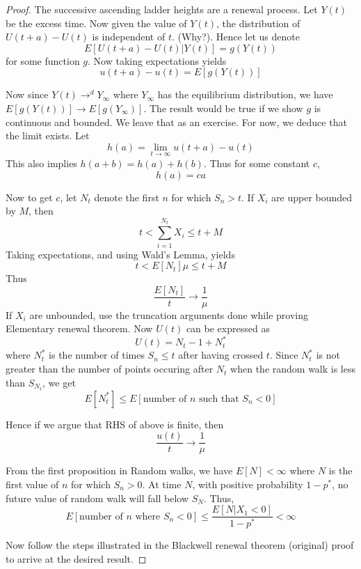 \documentclass[a4paper,10pt,english]{article}
\begin{document}
\begin{proof}
The successive ascending ladder heights are a renewal process. Let $Y(t)$ be the excess time. Now given the value of $Y(t)$, the distribution of $U(t+a) - U(t)$ is independent of $t$. (Why?). Hence let us denote
\[E[U(t+a) - U(t)|Y(t)] = g(Y(t))\]
for some function $g$. Now taking expectations yields
\[u(t+a) - u(t) = E[g(Y(t))]\]

Now since $Y(t) \to^d Y_\infty$ where $Y_\infty$ has the equilibrium distribution, we have $E[g(Y(t))] \to E[g(Y_\infty)]$. The result would be true if we show $g$ is continuous and bounded. We leave that as an exercise. For now, we deduce that the limit exists. Let
\[h(a) = \lim_{t \to \infty}u(t+a) - u(t)\]
This also implies $h(a+b) = h(a) + h(b)$. Thus for some constant $c$, 
\[h(a) = ca\]

Now to get $c$, let $N_t$ denote the first $n$ for which $S_n > t$. If $X_i$ are upper bounded by $M$, then
\[t < \sum_{i=1}^{N_t} X_i \leq t+M\]
Taking expectations, and using Wald's Lemma, yields
\[t < E[N_t]\mu \leq t+M\]
Thus 
\[\frac{E[N_t]}{t} \to \frac{1}{\mu}\]
If $X_i$ are unbounded, use the truncation arguments done while proving Elementary renewal theorem. Now $U(t)$ can be expressed as
\[U(t) = N_t -1 +N_t^*\]
where $N_t^*$ is the number of times $S_n \leq t$ after having crossed $t$. Since $N_t^*$ is not greater than the number of points occuring after $N_t$ when the random walk is less than $S_{N_t}$, we get
\[E[N_t^*] \leq E[\mbox{number of $n$ such that $S_n < 0$}]\]

Hence if we argue that RHS of above is finite, then
\[\frac{u(t)}{t} \to \frac{1}{\mu}\]

From the first proposition in Random walks, we have $E[N] <\infty$ where $N$ is the first value of $n$ for which $S_n > 0$. At time $N$, with positive probability $1-p^*$, no future value of random walk will fall below $S_N$. Thus,
\[E[\mbox{number of $n$ where $S_n < 0$}] \leq \frac{E[N|X_1<0]}{1-p^*} < \infty\]

Now follow the steps illustrated in the Blackwell renewal theorem (original) proof to arrive at the desired result.

\end{proof}
\end{document}
